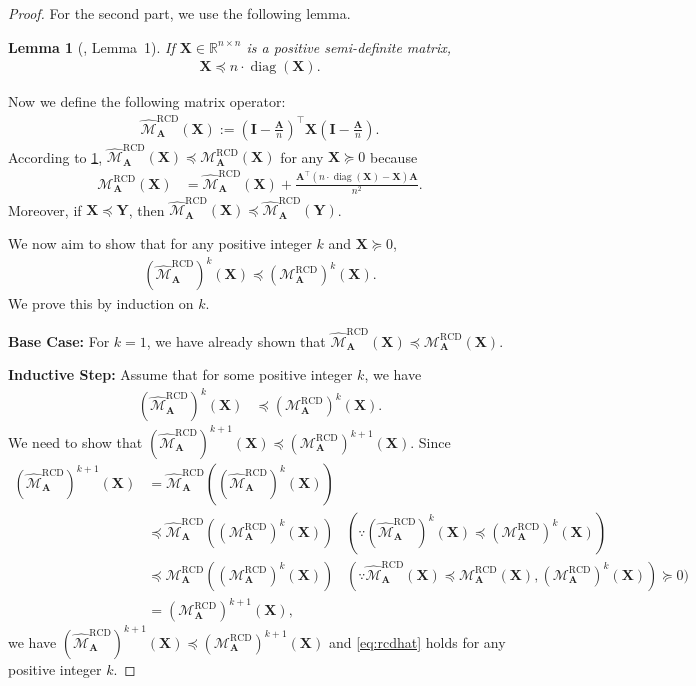 \documentclass{article}
\theoremstyle{plain}
\newtheorem{lemma}[theorem]{Lemma}
\theoremstyle{definition}
\theoremstyle{remark}
\def\bigopen#1{\left(#1\right)}
\newcommand{\RCD}{\text{RCD}} %
\newcommand{\MARCD}{\mathcal{M}_{\bm{A}}^{\RCD}} %
\def\mA{{\bm{A}}}
\def\mI{{\bm{I}}}
\def\mX{{\bm{X}}}
\def\mY{{\bm{Y}}}
\def\gM{{\mathcal{M}}}
\newcommand{\R}{\mathbb{R}}
\DeclareMathOperator{\diag}{diag}
\begin{document}
\begin{proof}
For the second part, we use the following lemma.
\begin{lemma}[\citet{nesterov12}, Lemma~1]
    \label{lem:diagineq}
    If $\mX \in \R^{n \times n}$ is a positive semi-definite matrix,
    \begin{align*}
        \mX \preceq n\cdot \diag(\mX).
    \end{align*}
\end{lemma}
Now we define the following matrix operator:
\begin{align*}
    \widehat{\gM}^{\RCD}_{\mA}(\mX) := \bigopen{\mI - \frac{\mA}{n}}^{\top} \mX \bigopen{\mI - \frac{\mA}{n}}.
\end{align*}
According to \cref{lem:diagineq}, $\widehat{\gM}^{\RCD}_{\mA}(\mX) \preceq \MARCD(\mX)$ for any $\mX \succeq 0$ because
\begin{align*}
    \MARCD(\mX) &= \widehat{\gM}^{\RCD}_{\mA}(\mX) + \frac{\mA^{\top} (n\cdot \diag(\mX) - \mX) \mA}{n^2}.
\end{align*} 
Moreover, if $\mX \preceq \mY$, then $\widehat{\gM}^{\RCD}_{\mA}(\mX) \preceq \widehat{\gM}^{\RCD}_{\mA}(\mY)$. 

We now aim to show that for any positive integer $k$ and $\mX \succeq 0$,
\begin{align}
    (\widehat{\gM}^{\RCD}_{\mA})^k (\mX) \preceq (\MARCD)^k (\mX).
    \label{eq:rcdhat}
\end{align}
We prove this by induction on $k$.

\textbf{Base Case:} For $k = 1$, we have already shown that $\widehat{\gM}^{\RCD}_{\mA}(\mX) \preceq \MARCD(\mX)$.

\textbf{Inductive Step:} Assume that for some positive integer $k$, we have 
\begin{align*}
    (\widehat{\gM}^{\RCD}_{\mA})^k (\mX) &\preceq (\MARCD)^k (\mX).
\end{align*} We need to show that $(\widehat{\gM}^{\RCD}_{\mA})^{k+1} (\mX) \preceq (\MARCD)^{k+1} (\mX)$. Since
\begin{align*}
    (\widehat{\gM}^{\RCD}_{\mA})^{k+1} (\mX) &= \widehat{\gM}^{\RCD}_{\mA} ((\widehat{\gM}^{\RCD}_{\mA})^k (\mX)) \\
    &\preceq \widehat{\gM}^{\RCD}_{\mA} ((\MARCD)^k (\mX)) & (\because (\widehat{\gM}^{\RCD}_{\mA})^k (\mX) \preceq (\MARCD)^k (\mX))\\
    &\preceq \MARCD ((\MARCD)^k (\mX)) & (\because \widehat{\gM}^{\RCD}_{\mA}(\mX) \preceq \MARCD(\mX), (\MARCD)^k (\mX)) \succeq 0) \\
    &= (\MARCD)^{k+1} (\mX),
\end{align*}
we have $(\widehat{\gM}^{\RCD}_{\mA})^{k+1} (\mX) \preceq (\MARCD)^{k+1} (\mX)$ and \cref{eq:rcdhat} holds for any positive integer $k$.


\end{proof}
\end{document}
